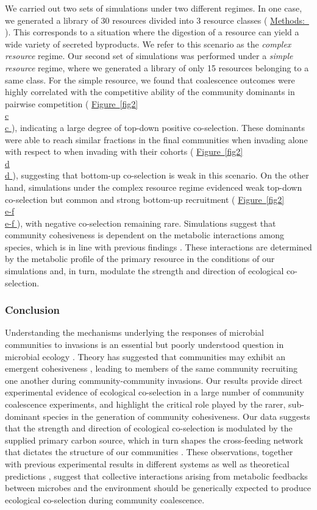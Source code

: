 \documentclass[a4paper,10pt]{article}
\newcommand{\figref}[2][]{%
  \hyperref[{#2}]{%
    Figure~\ref*{#2}%
    \ifx\\#1\\%
    \else
      #1%
    \fi
  }%
}
\newcommand{\methodsref}[1]{%
  \hyperref[{methods:#1}]{%
   Methods:~\nameref*{methods:#1}%
  }%
}
\begin{document}
We carried out two sets of simulations under two different regimes.
In one case, we generated a library of 30 resources divided into 3 resource classes
(\methodsref{sim}). This corresponds to a situation where the digestion of a resource
can yield a wide variety of secreted byproducts.
We refer to this scenario as the \textit{complex resource} regime.
Our second set of simulations was performed under a \textit{simple resource} regime, where we
generated a library of only 15 resources belonging to a same class.
For the simple resource, we found that coalescence outcomes were highly correlated with
the competitive ability of the community dominants in pairwise competition
(\figref[c]{fig2}),
indicating a large degree of top-down positive co-selection.
These dominants were able to reach similar fractions in the final communities when invading alone
with respect to when invading with their cohorts
(\figref[d]{fig2}),
suggesting that bottom-up co-selection is weak in this scenario.
On the other hand,
simulations under the complex resource regime evidenced weak top-down co-selection but 
common and strong bottom-up recruitment (\figref[e-f]{fig2}), with negative co-selection remaining rare.
Simulations suggest that community cohesiveness is dependent on the metabolic interactions among species,
which is in line with previous findings \cite{Goldford2018, Estrela2020}.
These interactions are determined by the metabolic profile of the primary resource in the conditions
of our simulations and, in turn, modulate the strength and direction of ecological co-selection.

\subsubsection*{Conclusion}

Understanding the mechanisms underlying the responses of microbial communities to invasions is
an essential but poorly understood question in microbial ecology \cite{Rillig2015}.
Theory has suggested that communities may exhibit an emergent cohesiveness
\cite{Gilpin1994,Livingston2013,Tikhonov2016,Tikhonov2017},
leading to members of the same community recruiting one another during
community-community invasions.
Our results provide direct experimental evidence of ecological co-selection in a large number
of community coalescence experiments,
and highlight the critical role played by the rarer, sub-dominant species in the generation
of community cohesiveness.
Our data suggests that the strength and direction of ecological co-selection is modulated
by the supplied primary carbon source,
which in turn shapes the cross-feeding network that dictates
the structure of our communities \cite{Goldford2018,Estrela2020}.
These observations,
together with previous experimental results in different systems \cite{Sierocinski2017} as well as
theoretical predictions
\cite{Gilpin1994,Toquenaga1997,Tikhonov2016,Tikhonov2017,Vila2019,Lechon2021},
suggest that collective interactions arising from metabolic feedbacks between microbes
and the environment should be generically expected to produce ecological co-selection
during community coalescence.
\end{document}
